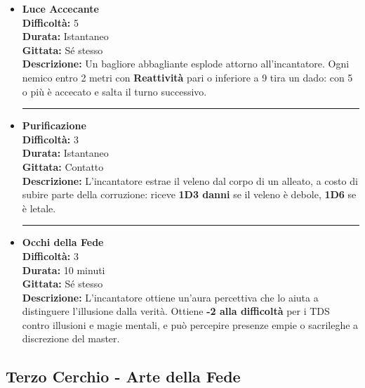 \documentclass[../manuale_main.tex]{subfiles}
\begin{document}
\begin{itemize}

\item \textbf{Luce Accecante} \\
\textbf{Difficoltà:} 5 \\
\textbf{Durata:} Istantaneo \\
\textbf{Gittata:} Sé stesso \\
\textbf{Descrizione:} Un bagliore abbagliante esplode attorno all’incantatore. Ogni nemico entro 2 metri con \textbf{Reattività} pari o inferiore a 9 tira un dado: con 5 o più è accecato e salta il turno successivo.

\vspace{0.5cm}\rule{\textwidth}{0.4pt}\vspace{1cm}

\item \textbf{Purificazione} \\
\textbf{Difficoltà:} 3 \\
\textbf{Durata:} Istantaneo \\
\textbf{Gittata:} Contatto \\
\textbf{Descrizione:} L’incantatore estrae il veleno dal corpo di un alleato, a costo di subire parte della corruzione: riceve \textbf{1D3 danni} se il veleno è debole, \textbf{1D6} se è letale.

\vspace{0.5cm}\rule{\textwidth}{0.4pt}\vspace{1cm}

\item \textbf{Occhi della Fede} \\
\textbf{Difficoltà:} 3 \\
\textbf{Durata:} 10 minuti \\
\textbf{Gittata:} Sé stesso \\
\textbf{Descrizione:} L’incantatore ottiene un’aura percettiva che lo aiuta a distinguere l’illusione dalla verità. Ottiene \textbf{-2 alla difficoltà} per i TDS contro illusioni e magie mentali, e può percepire presenze empie o sacrileghe a discrezione del master.


\end{itemize}

\clearpage
 \subsection*{Terzo Cerchio - Arte della Fede}
\end{document}
